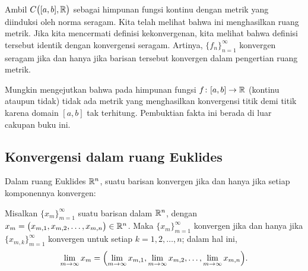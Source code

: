 \begin{example}
Ambil $C\bigl([a,b],{\mathbb{R}}\bigr)$ sebagai himpunan fungsi kontinu dengan metrik
yang diinduksi oleh norma seragam.  Kita telah melihat bahwa ini menghasilkan ruang metrik.
Jika kita mencermati definisi kekonvergenan, kita melihat bahwa definisi tersebut identik
dengan konvergensi seragam.  Artinya, $\{ f_n \}_{n=1}^\infty$ konvergen seragam jika dan hanya
jika barisan tersebut konvergen dalam pengertian ruang metrik.
\end{example}

\begin{remark}
Mungkin mengejutkan bahwa pada himpunan fungsi $f \colon [a,b] \to
{\mathbb{R}}$ (kontinu ataupun tidak)
tidak ada metrik yang menghasilkan konvergensi titik demi titik karena domain $[a,b]$
tak terhitung.  Pembuktian
fakta ini berada di luar cakupan buku ini.
\end{remark}

\subsection{Konvergensi dalam ruang Euklides}

Dalam ruang Euklides ${\mathbb{R}}^n$, suatu barisan konvergen jika dan hanya jika setiap
komponennya konvergen:

\begin{prop} \label{prop:msconveuc}
Misalkan $\{ x_m \}_{m=1}^\infty$ suatu barisan dalam ${\mathbb{R}}^n$,
dengan $x_m = \bigl(x_{m,1},x_{m,2},\ldots,x_{m,n}\bigr) \in {\mathbb{R}}^n$.
Maka $\{ x_m \}_{m=1}^\infty$ konvergen jika dan hanya jika
$\{ x_{m,k} \}_{m=1}^\infty$ konvergen untuk setiap $k=1,2,\ldots,n$; dalam hal ini,
\begin{equation*}
\lim_{m\to\infty}
x_m =
\Bigl(
\lim_{m\to\infty} x_{m,1},
\lim_{m\to\infty} x_{m,2},
\ldots,
\lim_{m\to\infty} x_{m,n}
\Bigr) .
\end{equation*}
\end{prop}


